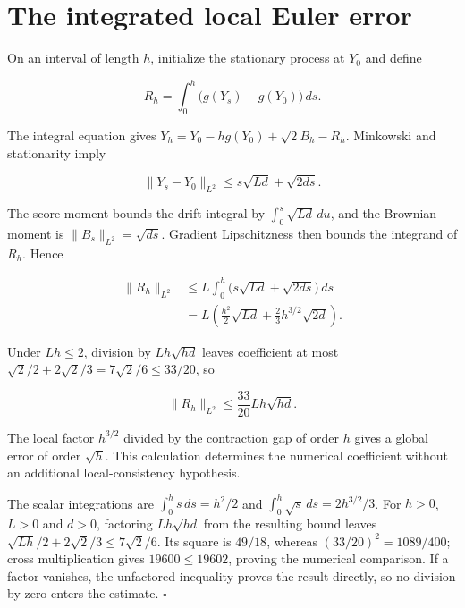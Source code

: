 \documentclass[11pt,a4paper]{article}
\begin{document}
\section{\texorpdfstring{The integrated local Euler error}{The integrated local Euler error}}



On an interval of length \(h\), initialize the stationary process at \(Y_0\) and define

\[R_h=\int_0^h\bigl(g(Y_s)-g(Y_0)\bigr)\,ds.\]

The integral equation gives \(Y_h=Y_0-hg(Y_0)+\sqrt2B_h-R_h\). Minkowski and stationarity imply

\[\|Y_s-Y_0\|_{L^2}\le s\sqrt{Ld}+\sqrt{2ds}.\]

The score moment \cite[Section~3.27.8]{LangevinLean2026ULASC} bounds the drift integral by \(\int_0^s\sqrt{Ld}\,du\), and the Brownian moment is \(\|B_s\|_{L^2}=\sqrt{ds}\). Gradient Lipschitzness then bounds the integrand of \(R_h\). Hence

\[\begin{aligned}
\|R_h\|_{L^2}
&\le L\int_0^h\bigl(s\sqrt{Ld}+\sqrt{2ds}\bigr)\,ds\\
&=L\left(\frac{h^2}{2}\sqrt{Ld}+\frac23h^{3/2}\sqrt{2d}\right).
\end{aligned}\]

Under \(Lh\le2\), division by \(Lh\sqrt{hd}\) leaves coefficient at most \(\sqrt2/2+2\sqrt2/3=7\sqrt2/6\le33/20\), so

\[\|R_h\|_{L^2}\le\frac{33}{20}Lh\sqrt{hd}.\]

The local factor \(h^{3/2}\) divided by the contraction gap of order \(h\) gives a global error of order \(\sqrt h\). This calculation determines the numerical coefficient without an additional local-consistency hypothesis.




The scalar integrations are \(\int_0^hs\,ds=h^2/2\) and \(\int_0^h\sqrt s\,ds=2h^{3/2}/3\). For \(h>0\), \(L>0\) and \(d>0\), factoring \(Lh\sqrt{hd}\) from the resulting bound leaves \(\sqrt{Lh}/2+2\sqrt2/3\le7\sqrt2/6\). Its square is \(49/18\), whereas \((33/20)^2=1089/400\); cross multiplication gives \(19600\le19602\), proving the numerical comparison. If a factor vanishes, the unfactored inequality proves the result directly, so no division by zero enters the estimate. \(\square\)
\end{document}
